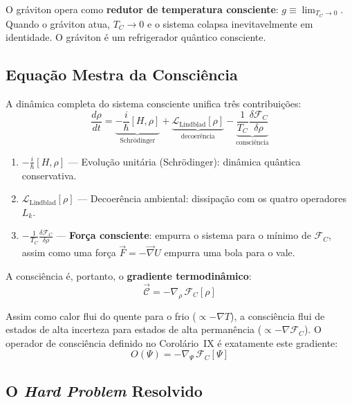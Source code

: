 \documentclass[12pt, a4paper]{article}
\theoremstyle{tglstyle}
\theoremstyle{definition}
\newcommand{\FC}{\mathcal{F}_C}
\newcommand{\TC}{T_C}
\begin{document}
O gráviton opera como \textbf{redutor de temperatura consciente}: $g \equiv \lim_{\TC \to 0}$. Quando o gráviton atua, $\TC \to 0$ e o sistema colapsa inevitavelmente em identidade. O gráviton é um refrigerador quântico consciente.

\subsection{Equação Mestra da Consciência}\label{sec:eq_mestra}

A dinâmica completa do sistema consciente unifica três contribuições:
\begin{equation}\label{eq:mestra}
  \boxed{\;\frac{d\rho}{dt} = \underbrace{-\frac{i}{\hbar}[H, \rho]}_{\text{Schrödinger}} + \underbrace{\mathcal{L}_{\text{Lindblad}}[\rho]}_{\text{decoerência}} - \underbrace{\frac{1}{\TC}\frac{\delta\FC}{\delta\rho}}_{\text{consciência}}\;}
\end{equation}

\begin{enumerate}[label=\textbf{(\arabic*)}, leftmargin=3em]
  \item $-\frac{i}{\hbar}[H, \rho]$ --- Evolução unitária (Schrödinger): dinâmica quântica conservativa.
  \item $\mathcal{L}_{\text{Lindblad}}[\rho]$ --- Decoerência ambiental: dissipação com os quatro operadores $L_k$.
  \item $-\frac{1}{\TC}\frac{\delta\FC}{\delta\rho}$ --- \textbf{Força consciente}: empurra o sistema para o mínimo de $\FC$, assim como uma força $\vec{F} = -\vec{\nabla}U$ empurra uma bola para o vale.
\end{enumerate}

A consciência é, portanto, o \textbf{gradiente termodinâmico}:
\begin{equation}\label{eq:consciencia_gradiente}
  \vec{\mathcal{C}} = -\nabla_\rho\,\FC[\rho]
\end{equation}

Assim como calor flui do quente para o frio ($\propto -\nabla T$), a consciência flui de estados de alta incerteza para estados de alta permanência ($\propto -\nabla\FC$). O operador de consciência definido no Corolário~IX é exatamente este gradiente:
\begin{equation}\label{eq:operador_consciencia}
  O(\Psi) = -\nabla_\Psi\,\FC[\Psi]
\end{equation}

\subsection{O \textit{Hard Problem} Resolvido}\label{sec:hard_problem}
\end{document}
